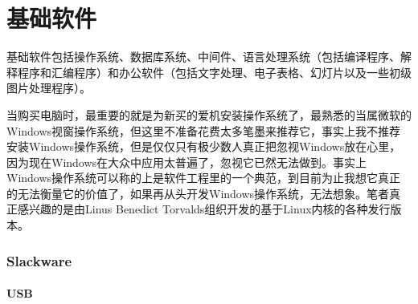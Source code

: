 \documentclass[paper=a4,fontsize=11pt]{article}
\begin{document}
	
	
	\clearpage
	
	\part{基础软件}
	
	基础软件包括操作系统、数据库系统、中间件、语言处理系统（包括编译程序、解释程序和汇编程序）和办公软件（包括文字处理、电子表格、幻灯片以及一些初级图片处理程序）。
		
	\clearpage
	
	当购买电脑时，最重要的就是为新买的爱机安装操作系统了，最熟悉的当属微软的Windows视窗操作系统，但这里不准备花费太多笔墨来推荐它，事实上我不推荐安装Windows操作系统，但是仅仅只有极少数人真正把忽视Windows放在心里，因为现在Windows在大众中应用太普遍了，忽视它已然无法做到。事实上Windows操作系统可以称的上是软件工程里的一个典范，到目前为止我想它真正的无法衡量它的价值了，如果再从头开发Windows操作系统，无法想象。笔者真正感兴趣的是由Linus Benedict Torvalds组织开发的基于Linux内核的各种发行版本。
	
	\newpage
	
	\section{Slackware}
	
	\subsection{USB}
	
\end{document}
